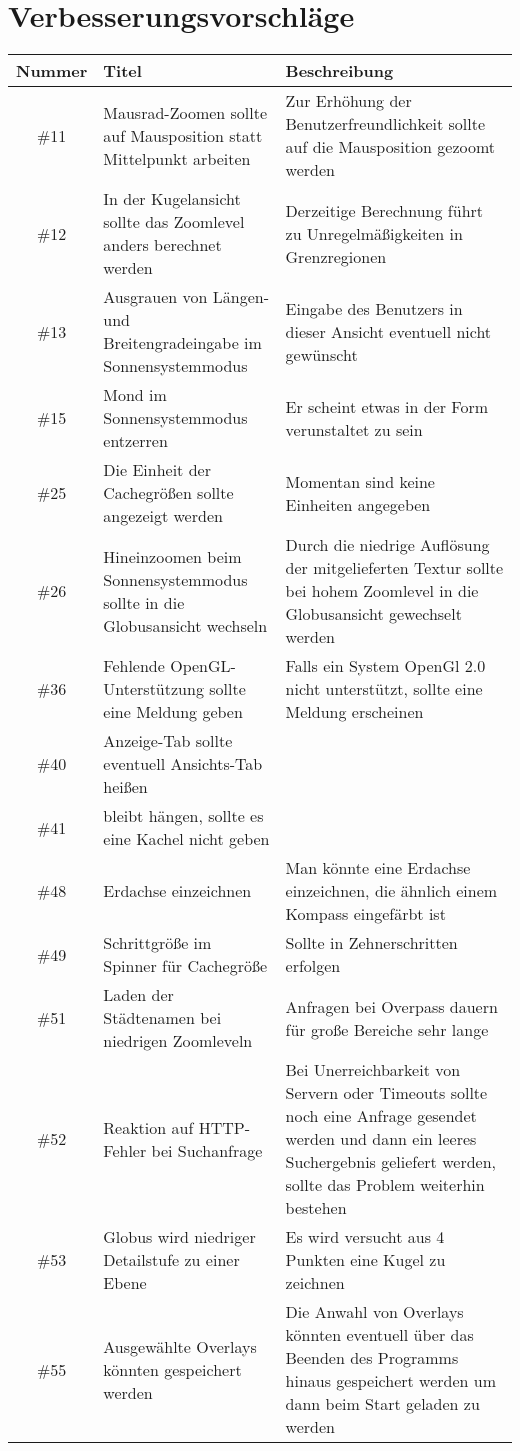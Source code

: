 \documentclass[10pt]{scrreprt}
\newcommand{\JoglEarth}{\raisebox{-1.2mm}{\texttt{[image: Logo-Text.eps]}} }
\begin{document}
\section{Verbesserungsvorschläge}
\begin{longtable}{|c|p{5.2cm}|p{8.2cm}|}
\hline
Nummer & Titel & Beschreibung \\
\hline
\hline
\#11 & Mausrad-Zoomen sollte auf Mausposition statt Mittelpunkt arbeiten & Zur Erhöhung der Benutzerfreundlichkeit sollte auf die Mausposition gezoomt werden \\
\hline
\#12 & In der Kugelansicht sollte das Zoomlevel anders berechnet werden & Derzeitige Berechnung führt zu Unregelmäßigkeiten in Grenzregionen \\
\hline
\#13 & Ausgrauen von Längen- und Breitengradeingabe im Sonnensystemmodus & Eingabe des Benutzers in dieser Ansicht eventuell nicht gewünscht \\
\hline
\#15 & Mond im Sonnensystemmodus entzerren & Er scheint etwas in der Form verunstaltet zu sein \\
\hline
\#25 & Die Einheit der Cachegrößen sollte angezeigt werden & Momentan sind keine Einheiten angegeben \\  
\hline
\#26 & Hineinzoomen beim Sonnensystemmodus sollte in die Globusansicht wechseln & Durch die niedrige Auflösung der mitgelieferten Textur sollte bei hohem Zoomlevel in die Globusansicht gewechselt werden \\
\hline
\#36 & Fehlende OpenGL-Unterstützung sollte eine Meldung geben & Falls ein System OpenGl 2.0 nicht unterstützt, sollte eine Meldung erscheinen \\
\hline
\#40 & Anzeige-Tab sollte eventuell Ansichts-Tab heißen & \\
\hline
\#41 & \JoglEarth bleibt hängen, sollte es eine Kachel nicht geben & \\
\hline
\#48 & Erdachse einzeichnen & Man könnte eine Erdachse einzeichnen, die ähnlich einem Kompass eingefärbt ist \\
\hline
\#49 & Schrittgröße im Spinner für Cachegröße &
Sollte in Zehnerschritten erfolgen \\
\hline
\#51 & Laden der Städtenamen bei niedrigen Zoomleveln & Anfragen bei Overpass dauern für große Bereiche sehr lange \\
\hline
\#52 & Reaktion auf HTTP-Fehler bei Suchanfrage & Bei Unerreichbarkeit von Servern oder Timeouts sollte noch eine Anfrage gesendet werden und dann ein leeres Suchergebnis geliefert werden, sollte das Problem weiterhin bestehen \\
\hline
\#53 & Globus wird niedriger Detailstufe zu einer Ebene & Es wird versucht aus 4 Punkten eine Kugel zu zeichnen \\
\hline
\#55 & Ausgewählte Overlays könnten gespeichert werden & Die Anwahl von Overlays könnten eventuell über das Beenden des Programms hinaus gespeichert werden um dann beim Start geladen zu werden \\
\hline
\end{longtable}
\end{document}
